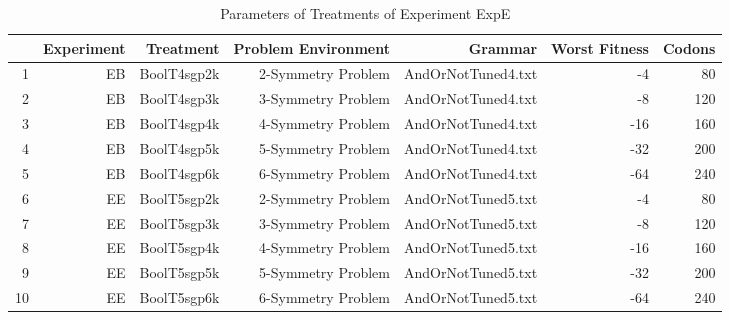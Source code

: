 \begin{table}[ht]
\centering
\begin{tabular}{rrrrrrr}
  \hline
 & Experiment & Treatment & Problem Environment & Grammar & Worst Fitness & Codons \\ 
  \hline
1 & EB & BoolT4sgp2k & 2-Symmetry Problem & AndOrNotTuned4.txt &  -4 &  80 \\ 
  2 & EB & BoolT4sgp3k & 3-Symmetry Problem & AndOrNotTuned4.txt &  -8 & 120 \\ 
  3 & EB & BoolT4sgp4k & 4-Symmetry Problem & AndOrNotTuned4.txt & -16 & 160 \\ 
  4 & EB & BoolT4sgp5k & 5-Symmetry Problem & AndOrNotTuned4.txt & -32 & 200 \\ 
  5 & EB & BoolT4sgp6k & 6-Symmetry Problem & AndOrNotTuned4.txt & -64 & 240 \\ 
  6 & EE & BoolT5sgp2k & 2-Symmetry Problem & AndOrNotTuned5.txt &  -4 &  80 \\ 
  7 & EE & BoolT5sgp3k & 3-Symmetry Problem & AndOrNotTuned5.txt &  -8 & 120 \\ 
  8 & EE & BoolT5sgp4k & 4-Symmetry Problem & AndOrNotTuned5.txt & -16 & 160 \\ 
  9 & EE & BoolT5sgp5k & 5-Symmetry Problem & AndOrNotTuned5.txt & -32 & 200 \\ 
  10 & EE & BoolT5sgp6k & 6-Symmetry Problem & AndOrNotTuned5.txt & -64 & 240 \\ 
   \hline
\end{tabular}
\caption{Parameters of Treatments of Experiment ExpE} 
\end{table}
